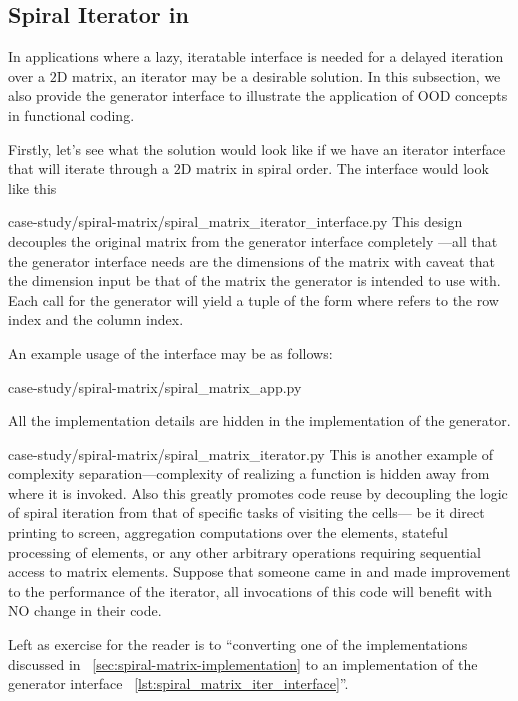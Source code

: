 \subsection{Spiral Iterator in \python}\label{subsec:spiralIterator}

In applications where a lazy, iteratable interface is needed for a delayed iteration over a $2$D
matrix, an iterator may be a desirable solution.
In this subsection, we also provide the \python generator interface to illustrate the application
of OOD concepts in functional coding.

Firstly, let's see what the solution would look like if we have an iterator interface that will
iterate through a $2$D matrix in spiral order.
The interface would look like this

{case-study/spiral-matrix/spiral_matrix_iterator_interface.py}
This design decouples the original matrix from the generator interface completely
---all that the generator interface needs are the dimensions of the matrix with
caveat that the dimension input be that of the matrix the generator is intended to use with.
Each call for the generator will yield a tuple of the form 
where  refers to the row index and  the column index.

An example usage of the interface may be as follows:

{case-study/spiral-matrix/spiral_matrix_app.py}

All the implementation details are hidden in the implementation of the generator.

{case-study/spiral-matrix/spiral_matrix_iterator.py}
This is another example of complexity separation---complexity of realizing a function is
hidden away from where it is invoked.
Also this greatly promotes code reuse by decoupling the logic of spiral
iteration from that of specific tasks of visiting the cells---
be it direct printing to screen, aggregation
computations over the elements, stateful processing of elements, or any other
arbitrary operations requiring sequential access to matrix elements.
Suppose that someone came in and made improvement to the performance of the iterator,
all invocations of this code will benefit with NO change in their code.

Left as exercise for the reader is to ``converting one of the implementations discussed in
~\autoref{sec:spiral-matrix-implementation} to an
implementation of the generator interface ~\autoref{lst:spiral_matrix_iter_interface}''.
